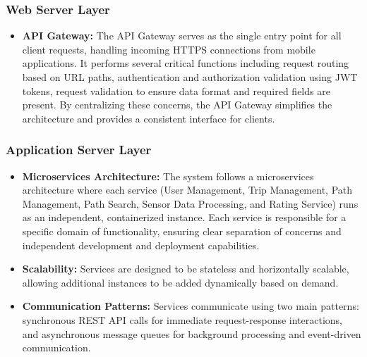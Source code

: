\subsubsection{Web Server Layer}
\begin{itemize}
    \item \textbf{API Gateway:} The API Gateway serves as the single entry point for all client requests, handling incoming HTTPS connections from mobile applications. It performs several critical functions including request routing based on URL paths, authentication and authorization validation using JWT tokens, request validation to ensure data format and required fields are present. By centralizing these concerns, the API Gateway simplifies the architecture and provides a consistent interface for clients.
\end{itemize}

\subsubsection{Application Server Layer}
\begin{itemize}
    \item \textbf{Microservices Architecture:} The system follows a microservices architecture where each service (User Management, Trip Management, Path Management, Path Search, Sensor Data Processing, and Rating Service) runs as an independent, containerized instance. Each service is responsible for a specific domain of functionality, ensuring clear separation of concerns and independent development and deployment capabilities.
    
    \item \textbf{Scalability:} Services are designed to be stateless and horizontally scalable, allowing additional instances to be added dynamically based on demand.
    
    \item \textbf{Communication Patterns:} Services communicate using two main patterns: synchronous REST API calls for immediate request-response interactions, and asynchronous message queues for background processing and event-driven communication.
\end{itemize}

